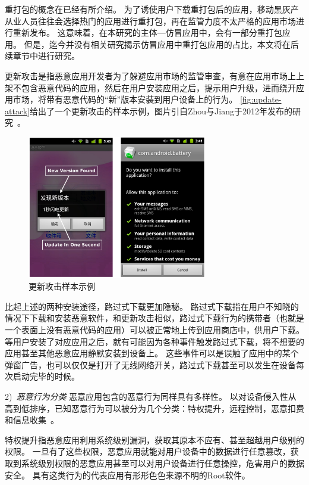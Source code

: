 重打包的概念在已经有所介绍。
为了诱使用户下载重打包后的应用，移动黑灰产从业人员往往会选择热门的应用进行重打包，再在监管力度不太严格的应用市场进行重新发布。
这意味着，在本研究的主体---仿冒应用中，会有一部分重打包应用。
但是，迄今并没有相关研究揭示仿冒应用中重打包应用的占比，本文将在后续章节中进行研究。

更新攻击是指恶意应用开发者为了躲避应用市场的监管审查，有意在应用市场上上架不包含恶意代码的应用，然后在用户安装应用之后，提示用户升级，进而绕开应用市场，将带有恶意代码的``新''版本安装到用户设备上的行为。
\autoref{fig:update-attack}给出了一个更新攻击的样本示例，图片引自Zhou与Jiang于2012年发布的研究~\cite{Zhou2012DissectingAM}。

\begin{figure}[h]
	\centering
	\includegraphics[width=0.7\textwidth]{./Figures/edwin-update-attack}
	\caption{更新攻击样本示例}
	\label{fig:update-attack}
	\vspace{-5mm}
\end{figure}

比起上述的两种安装途径，路过式下载更加隐秘。
路过式下载指在用户不知晓的情况下下载和安装恶意软件，和更新攻击相似，路过式下载行为的携带者（也就是一个表面上没有恶意代码的应用）可以被正常地上传到应用商店中，供用户下载。
等用户安装了对应应用之后，就有可能因为各种事件触发路过式下载，将不想要的应用甚至其他恶意应用静默安装到设备上。
这些事件可以是误触了应用中的某个弹窗广告，也可以仅仅是打开了无线网络开关，路过式下载甚至可以发生在设备每次启动完毕的时候。

2)\ \emph{恶意行为分类} \quad
恶意应用包含的恶意行为同样具有多样性。
以对设备侵入性从高到低排序，已知恶意行为可以被分为几个分类：特权提升，远程控制，恶意扣费和信息收集~\cite{Zhou2012DissectingAM}。

特权提升指恶意应用利用系统级别漏洞，获取其原本不应有、甚至超越用户级别的权限。
一旦有了这些权限，恶意应用就能对用户设备中的数据进行任意篡改，获取到系统级别权限的恶意应用甚至可以对用户设备进行任意操控，危害用户的数据安全。
具有这类行为的代表应用有形形色色来源不明的Root软件。


